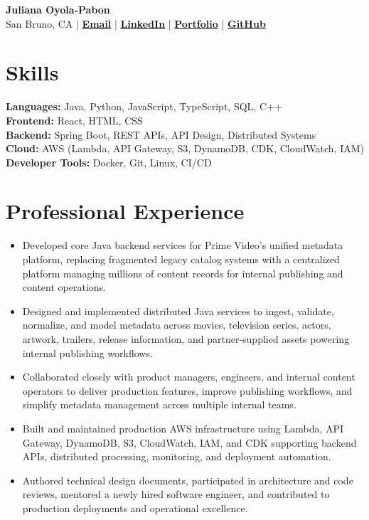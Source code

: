 \documentclass[10pt,letterpaper]{article}
\begin{document}
\begin{center}
{\LARGE\bfseries\color{Accent} Juliana Oyola-Pabon}\\[4pt]
San Bruno, CA
\;|\;
\href{mailto:julianaaoyola@gmail.com}{\textbf{Email}}
\;|\;
\href{https://linkedin.com/in/julianaoyola}{\textbf{LinkedIn}}
\;|\;
\href{https://juliana-portfolio-two.vercel.app/}{\textbf{Portfolio}}
\;|\;
\href{https://github.com/julsoyola}{\textbf{GitHub}}
\end{center}

\vspace{-2pt}

\section*{Skills}

\textbf{Languages:} Java, Python, JavaScript, TypeScript, SQL, C++ \\
\textbf{Frontend:} React, HTML, CSS \\
\textbf{Backend:} Spring Boot, REST APIs, API Design, Distributed Systems \\
\textbf{Cloud:} AWS (Lambda, API Gateway, S3, DynamoDB, CDK, CloudWatch, IAM) \\
\textbf{Developer Tools:} Docker, Git, Linux, CI/CD

\section*{Professional Experience}


\begin{itemize}
\item Developed core Java backend services for Prime Video's unified metadata platform, replacing fragmented legacy catalog systems with a centralized platform managing millions of content records for internal publishing and content operations.
\item Designed and implemented distributed Java services to ingest, validate, normalize, and model metadata across movies, television series, actors, artwork, trailers, release information, and partner-supplied assets powering internal publishing workflows.
\item Collaborated closely with product managers, engineers, and internal content operators to deliver production features, improve publishing workflows, and simplify metadata management across multiple internal teams.
\item Built and maintained production AWS infrastructure using Lambda, API Gateway, DynamoDB, S3, CloudWatch, IAM, and CDK supporting backend APIs, distributed processing, monitoring, and deployment automation.
\item Authored technical design documents, participated in architecture and code reviews, mentored a newly hired software engineer, and contributed to production deployments and operational excellence.
\end{itemize}
\end{document}

